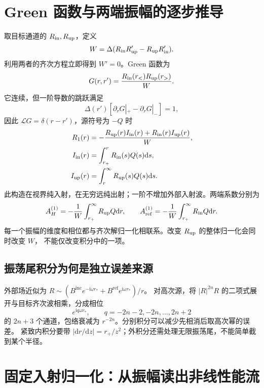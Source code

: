 \documentclass[UTF8,fontset=fandol,11pt,a4paper]{ctexart}
\newcommand{\ii}{\mathrm{i}}
\newcommand{\dd}{\mathrm{d}}
\newcommand{\Bin}{B^{\mathrm{inc}}}
\newcommand{\Bref}{B^{\mathrm{ref}}}
\newcommand{\AH}{A_H^{(1)}}
\newcommand{\Aref}{A_{\mathrm{ref}}^{(1)}}
\numberwithin{equation}{section}
\begin{document}
\section{Green 函数与两端振幅的逐步推导}
取目标通道的 $R_{\rm in},R_{\rm up}$，定义
\begin{equation}
W=\Delta(R_{\rm in}R'_{\rm up}-R_{\rm up}R'_{\rm in}).
\end{equation}
利用两者的齐次方程立即得到 $W'=0$。Green 函数为
\begin{equation}
G(r,r')=\frac{R_{\rm in}(r_<)R_{\rm up}(r_>)}W.
\end{equation}
它连续，但一阶导数的跳跃满足
\begin{equation}\Delta(r')[\partial_rG|_+-\partial_rG|_-]=1,\end{equation}
因此 $\mathcal L G=\delta(r-r')$，源符号为 $-Q$ 时
\begin{align}
R_1(r)&=-\frac{R_{\rm up}(r)I_{\rm in}(r)+R_{\rm in}(r)I_{\rm up}(r)}W,\\
I_{\rm in}(r)&=\int_{r_+}^r R_{\rm in}(s)Q(s)\dd s,\\
I_{\rm up}(r)&=\int_r^\infty R_{\rm up}(s)Q(s)\dd s.
\end{align}
此构造在视界纯入射，在无穷远纯出射；一阶不增加外部入射波。两端系数分别为
\begin{equation}
\AH=-\frac1W\int_{r_+}^\infty R_{\rm up}Q\dd r,\qquad
\Aref=-\frac1W\int_{r_+}^\infty R_{\rm in}Q\dd r.
\end{equation}
每一个振幅的维度和相位都与齐次解归一化相联系。改变 $R_{\rm up}$ 的整体归一化会同时改变 $W$，
不能仅改变积分中的一项。

\subsection{振荡尾积分为何是独立误差来源}
外部场近似为 $R\sim(\Bin e^{-\ii\omega r_*}+\Bref e^{\ii\omega r_*})/r$。
对高次源，将 $|R|^{2n}R$ 的二项式展开与目标齐次波相乘，分成相位
\begin{equation}
e^{\ii q\omega r_*},\qquad q=-2n-2,-2n,\ldots,2n+2
\end{equation}
的 $2n+3$ 个通道，包络衰减为 $r^{-2n}$。分别积分可以减少先相消后取高次幂的误差。
紧致内积分要带 $|\dd r/\dd z|=r_+/z^2$；外积分还需处理无限振荡尾，不能简单截到某个半径。

\section{固定入射归一化：从振幅读出非线性能流}
\end{document}
